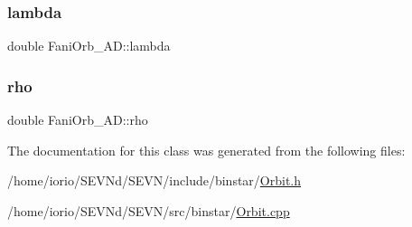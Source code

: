 \mbox{\label{class_fani_orb___a_d_ac14ac15d264fb98bad1e422a7b39c1f4}} 
\subsubsection{\texorpdfstring{lambda}{lambda}}
{\footnotesize\ttfamily double Fani\+Orb\+\_\+\+A\+D\+::lambda\hspace{0.3cm}{\ttfamily [private]}}

\mbox{\label{class_fani_orb___a_d_a488d6352161ebfe60c19cbe2a13bf946}} 
\subsubsection{\texorpdfstring{rho}{rho}}
{\footnotesize\ttfamily double Fani\+Orb\+\_\+\+A\+D\+::rho\hspace{0.3cm}{\ttfamily [private]}}



The documentation for this class was generated from the following files\+:\begin{DoxyCompactItemize}
\item 
/home/iorio/\+S\+E\+V\+Nd/\+S\+E\+V\+N/include/binstar/\hyperlink{_orbit_8h}{Orbit.\+h}\item 
/home/iorio/\+S\+E\+V\+Nd/\+S\+E\+V\+N/src/binstar/\hyperlink{_orbit_8cpp}{Orbit.\+cpp}\end{DoxyCompactItemize}
